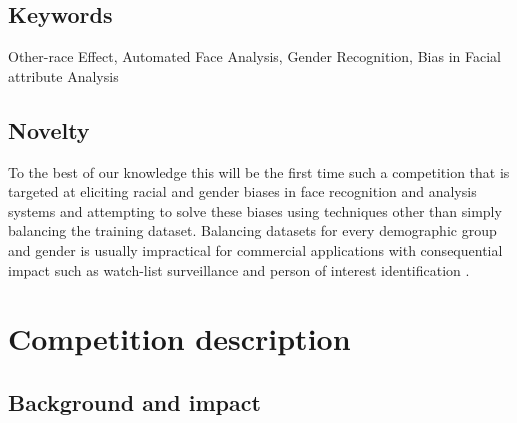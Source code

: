 \documentclass[11pt, oneside]{article}
\makeatletter
\let\@internalcite\cite
\def\cite{\def\citeauthoryear##1##2{##1, ##2}\@internalcite}
\makeatother
\begin{document}
\subsection{Keywords}
Other-race Effect, Automated Face Analysis, Gender Recognition, Bias in Facial
attribute Analysis

\subsection{Novelty}
To the best of our knowledge this will be the first time such a competition that 
is targeted at eliciting racial and gender biases in face recognition and 
analysis systems and attempting to solve these biases using techniques other 
than simply balancing the training dataset. Balancing datasets for every 
demographic group and gender is usually impractical for commercial applications 
with consequential impact such as watch-list surveillance 
\cite{kamgar2011toward} and person of interest identification 
\cite{best2014unconstrained}.

\section{Competition description}

\subsection{Background and impact}

\end{document}
